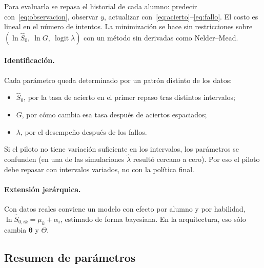 \documentclass[11pt]{article}
\theoremstyle{definition}
\theoremstyle{remark}
\newcommand{\Sh}{\hat S}
\begin{document}
Para evaluarla se repasa el historial de cada alumno: predecir con~\eqref{eq:observacion}, observar $y$, actualizar con~\eqref{eq:acierto}--\eqref{eq:fallo}. El costo es lineal en el número de intentos. La minimización se hace sin restricciones sobre $(\ln\Sh_0,\ \ln G,\ \operatorname{logit}\lambda)$ con un método sin derivadas como Nelder--Mead.

\paragraph{Identificación.} Cada parámetro queda determinado por un patrón distinto de los datos:
\begin{itemize}
\item $\Sh_0$, por la tasa de acierto en el primer repaso tras distintos intervalos;
\item $G$, por cómo cambia esa tasa después de aciertos espaciados;
\item $\lambda$, por el desempeño después de los fallos.
\end{itemize}
Si el piloto no tiene variación suficiente en los intervalos, los parámetros se confunden (en una de las simulaciones $\hat\lambda$ resultó cercano a cero). Por eso el piloto debe repasar con intervalos variados, no con la política final.

\paragraph{Extensión jerárquica.} Con datos reales conviene un modelo con efecto por alumno y por habilidad, $\ln\Sh_{0,ik}=\mu_k+\alpha_i$, estimado de forma bayesiana. En la arquitectura, eso sólo cambia $\bm\theta$ y $\Theta$.

\subsection{Resumen de parámetros}
\end{document}
